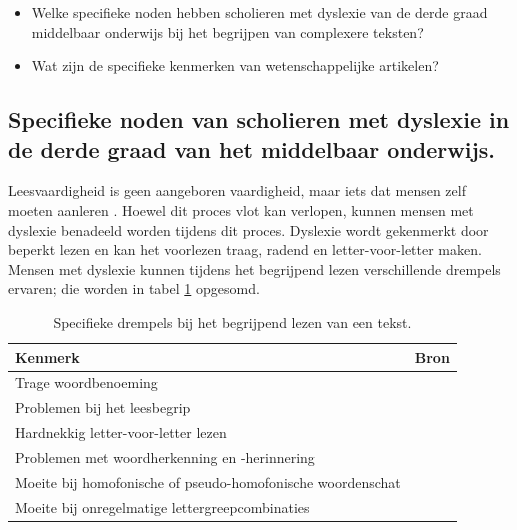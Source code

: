 \begin{itemize}
	\item Welke specifieke noden hebben scholieren met dyslexie van de derde graad middelbaar onderwijs bij het begrijpen van complexere teksten?
	\item Wat zijn de specifieke kenmerken van wetenschappelijke artikelen?
\end{itemize}

\subsection{Specifieke noden van scholieren met dyslexie in de derde graad van het middelbaar onderwijs.}

Leesvaardigheid is geen aangeboren vaardigheid, maar iets dat mensen zelf moeten aanleren \autocite{Bonte2020, VanDerMeer2022}. Hoewel dit proces vlot kan verlopen, kunnen mensen met dyslexie benadeeld worden tijdens dit proces.  Dyslexie wordt gekenmerkt door beperkt lezen en kan het voorlezen traag, radend en letter-voor-letter maken. Mensen met dyslexie kunnen tijdens het begrijpend lezen verschillende drempels ervaren; die worden in tabel \ref{table:dyslexia-hurdles} opgesomd.

\begin{center}
	\begin{table}[H]
	\begin{tabular}{ | m{10cm} | m{6cm} | } 
		\hline
		\textbf{Kenmerk} & \textbf{Bron} \\ 
		\hline
		Trage woordbenoeming &  \autocite{Bonte2020} \\
		\hline
		Problemen bij het leesbegrip & \autocite{Gala2016, Bonte2020} \\ 
		\hline
		Hardnekkig letter-voor-letter lezen & \autocite{Bonte2020, Zhang2021} \\ 
		\hline
		Problemen met woordherkenning en -herinnering & \autocite{Bonte2020} \\
		\hline
		Moeite bij homofonische of pseudo-homofonische woordenschat & \autocite{Zhang2021} \\
		\hline
		Moeite bij onregelmatige lettergreepcombinaties & \textcite{Gala2016} \\
		\hline
	\end{tabular}
	\caption{Specifieke drempels bij het begrijpend lezen van een tekst.}
	\label{table:dyslexia-hurdles}
	\end{table}
\end{center}

